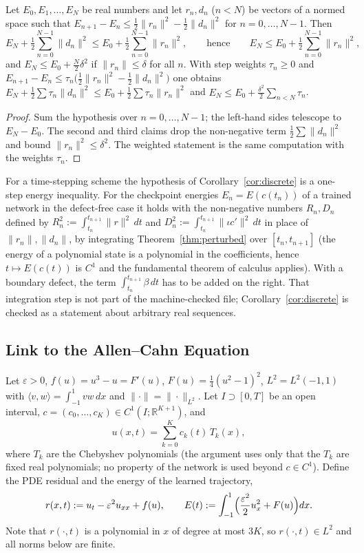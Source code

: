 \begin{Corollary}\label{cor:discrete}
Let $E_0,E_1,\dots,E_N$ be real numbers and let $r_n,d_n$ ($n<N$) be vectors of a normed space such that $E_{n+1}-E_n\le\tfrac12\|r_n\|^2-\tfrac12\|d_n\|^2$ for $n=0,\dots,N-1$. Then
\[
E_N+\tfrac12\sum_{n=0}^{N-1}\|d_n\|^2\le E_0+\tfrac12\sum_{n=0}^{N-1}\|r_n\|^2,
\qquad\text{hence}\qquad E_N\le E_0+\tfrac12\sum_{n=0}^{N-1}\|r_n\|^2 ,
\]
and $E_N\le E_0+\frac N2\delta^2$ if $\|r_n\|\le\delta$ for all $n$.
With step weights $\tau_n\ge0$ and $E_{n+1}-E_n\le\tau_n\bigl(\tfrac12\|r_n\|^2-\tfrac12\|d_n\|^2\bigr)$ one obtains $E_N+\tfrac12\sum\tau_n\|d_n\|^2\le E_0+\tfrac12\sum\tau_n\|r_n\|^2$ and $E_N\le E_0+\frac{\delta^2}{2}\sum_{n<N}\tau_n$.
\end{Corollary}
\begin{proof}
Sum the hypothesis over $n=0,\dots,N-1$; the left-hand sides telescope to $E_N-E_0$.
The second and third claims drop the non-negative term $\frac12\sum\|d_n\|^2$ and bound $\|r_n\|^2\le\delta^2$.
The weighted statement is the same computation with the weights $\tau_n$.
\end{proof}

\begin{Remark}
For a time-stepping scheme the hypothesis of Corollary~\ref{cor:discrete} is a one-step energy inequality.
For the checkpoint energies $E_n=E(c(t_n))$ of a trained network in the defect-free case it holds with the non-negative numbers $R_n,D_n$ defined by $R_n^2:=\int_{t_n}^{t_{n+1}}\|r\|^2\,dt$ and $D_n^2:=\int_{t_n}^{t_{n+1}}\|\iota c'\|^2\,dt$ in place of $\|r_n\|,\|d_n\|$, by integrating Theorem~\ref{thm:perturbed} over $[t_n,t_{n+1}]$ (the energy of a polynomial state is a polynomial in the coefficients, hence $t\mapsto E(c(t))$ is $C^1$ and the fundamental theorem of calculus applies).
With a boundary defect, the term $\int_{t_n}^{t_{n+1}}\beta\,dt$ has to be added on the right.
That integration step is not part of the machine-checked file; Corollary~\ref{cor:discrete} is checked as a statement about arbitrary real sequences.
\end{Remark}

\subsection{Link to the Allen--Cahn Equation}\label{app:perturbed-pde}

Let $\varepsilon>0$, $f(u)=u^3-u=F'(u)$, $F(u)=\tfrac14(u^2-1)^2$, $L^2=L^2(-1,1)$ with $\langle v,w\rangle=\int_{-1}^{1}vw\,dx$ and $\|\cdot\|=\|\cdot\|_{L^2}$.
Let $I\supset[0,T]$ be an open interval, $c=(c_0,\dots,c_K)\in C^1(I;\mathbb{R}^{K+1})$, and
\[
u(x,t)=\sum_{k=0}^{K}c_k(t)\,T_k(x),
\]
where $T_k$ are the Chebyshev polynomials (the argument uses only that the $T_k$ are fixed real polynomials; no property of the network is used beyond $c\in C^1$).
Define the PDE residual and the energy of the learned trajectory,
\[
r(x,t):=u_t-\varepsilon^2u_{xx}+f(u),\qquad E(t):=\int_{-1}^{1}\Bigl(\frac{\varepsilon^2}{2}u_x^2+F(u)\Bigr)dx .
\]
Note that $r(\cdot,t)$ is a polynomial in $x$ of degree at most $3K$, so $r(\cdot,t)\in L^2$ and all norms below are finite.


